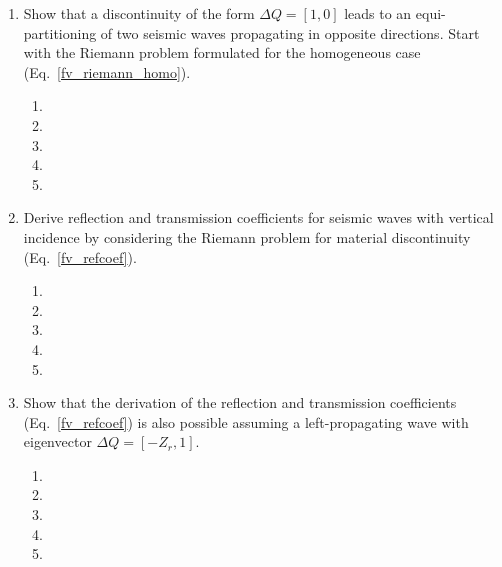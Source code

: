 \begin{enumerate}
\begin{enumerate}
\end{enumerate}
\item
Show that a discontinuity of the form $\Delta Q = [1,0]$ leads to an equi-partitioning of two seismic waves propagating in opposite directions. Start with the Riemann problem formulated for the homogeneous case (Eq.~\ref{fv_riemann_homo}). 
\begin{enumerate}
\item[]
\item[]
\item[] 
\item[]
\item[] 
\end{enumerate}
\item
Derive reflection and transmission coefficients for seismic waves with vertical incidence by considering the Riemann problem for material discontinuity (Eq.~\ref{fv_refcoef}). 
\begin{enumerate}
\item[]
\item[]
\item[] 
\item[]
\item[] 
\end{enumerate}
\item
Show that the derivation of the reflection and transmission coefficients (Eq.~\ref{fv_refcoef}) is also possible assuming a left-propagating wave with eigenvector $\Delta Q = [-Z_r, 1]$. 
\begin{enumerate}
\item[]
\item[]
\item[] 
\item[]
\item[] 
\end{enumerate}
\end{enumerate}

